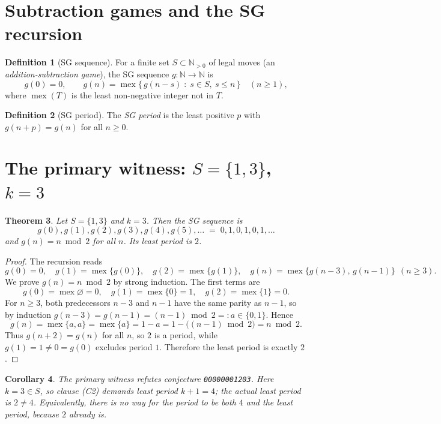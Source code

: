 \documentclass[11pt]{article}
\newtheorem{theorem}{Theorem}
\newtheorem{corollary}[theorem]{Corollary}
\theoremstyle{definition}
\newtheorem{definition}[theorem]{Definition}
\theoremstyle{remark}
\newcommand{\mex}{\operatorname{mex}}
\begin{document}
\section{Subtraction games and the SG recursion}

\begin{definition}[SG sequence]
For a finite set $S \subset \mathbb{N}_{>0}$ of legal moves (an
\emph{addition-subtraction game}), the SG sequence $g \colon \mathbb{N} \to
\mathbb{N}$ is
\[
g(0) = 0, \qquad g(n) = \mex\{\, g(n-s) \;:\; s \in S,\ s \le n \,\} \quad (n \ge 1),
\]
where $\mex(T)$ is the least non-negative integer not in $T$.
\end{definition}

\begin{definition}[SG period]
The \emph{SG period} is the least positive $p$ with $g(n+p) = g(n)$ for all
$n \ge 0$.
\end{definition}

\section{The primary witness: $S = \{1,3\}$, $k = 3$}

\begin{theorem}\label{thm:primary}
Let $S = \{1,3\}$ and $k = 3$. Then the SG sequence is
\[
g(0), g(1), g(2), g(3), g(4), g(5), \dots \;=\; 0, 1, 0, 1, 0, 1, \dots
\]
and $g(n) = n \bmod 2$ for all $n$. Its least period is $2$.
\end{theorem}

\begin{proof}
The recursion reads
\[
g(0)=0,\quad
g(1)=\mex\{g(0)\},\quad
g(2)=\mex\{g(1)\},\quad
g(n)=\mex\{g(n-3),\,g(n-1)\}\ \ (n \ge 3).
\]
We prove $g(n) = n \bmod 2$ by strong induction. The first terms are
\[
g(0)=\mex\varnothing=0,\quad
g(1)=\mex\{0\}=1,\quad
g(2)=\mex\{1\}=0 .
\]
For $n \ge 3$, both predecessors $n-3$ and $n-1$ have the same parity as
$n-1$, so by induction $g(n-3) = g(n-1) = (n-1) \bmod 2 =: a \in \{0,1\}$.
Hence
\[
g(n) = \mex\{a, a\} = \mex\{a\} = 1 - a = 1 - \bigl((n-1) \bmod 2\bigr) = n \bmod 2 .
\]
Thus $g(n+2) = g(n)$ for all $n$, so $2$ is a period, while $g(1) = 1 \ne 0 =
g(0)$ excludes period $1$. Therefore the least period is exactly $2$.
\end{proof}

\begin{corollary}\label{cor:primary}
The primary witness refutes conjecture \texttt{00000001203}. Here
$k = 3 \in S$, so clause (C2) demands least period $k+1 = 4$; the actual least
period is $2 \ne 4$. Equivalently, there is no way for the period to be both
$4$ and the least period, because $2$ already is.
\end{corollary}
\end{document}
